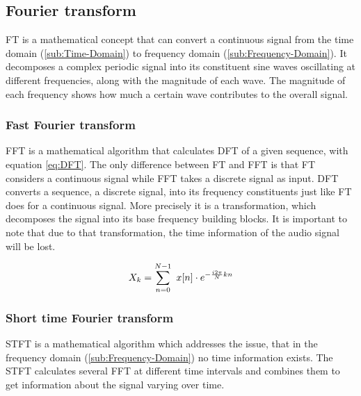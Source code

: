 \subsection{Fourier transform}
\label{sub:Fourier-Transform}
\Gls{FT} is a mathematical concept that can convert a continuous signal from the time domain (\ref{sub:Time-Domain}) to frequency domain (\ref{sub:Frequency-Domain}). It decomposes a complex periodic signal into its constituent sine waves oscillating at different frequencies, along with the magnitude of each wave. The magnitude of each frequency shows how much a certain wave contributes to the overall signal.

\subsubsection{Fast Fourier transform}
\label{subsub:Fast-Fourier-Transform}
\Gls{FFT} is a mathematical algorithm that calculates \gls{DFT} of a given sequence, with equation \ref{eq:DFT}. The only difference between \gls{FT} and \gls{FFT} is that \gls{FT} considers a continuous signal while \gls{FFT} takes a discrete signal as input. \Gls{DFT} converts a sequence, a discrete signal, into its frequency constituents just like \gls{FT} does for a continuous signal. More precisely it is a transformation, which decomposes the signal into its base frequency building blocks. It is important to note that due to that transformation, the time information of the audio signal will be lost.

\begin{equation}
    \centering
    X_k = \sum_{n=0}^{N-1} \ x[n] \cdot e^{-\frac{i2\pi}{N}kn}
    \label{eq:DFT}
\end{equation}

\subsubsection{Short time Fourier transform}
\label{subsub:Short-Time-Fourier-Transform}
\Gls{STFT} is a mathematical algorithm which addresses the issue, that in the frequency domain (\ref{sub:Frequency-Domain}) no time information exists. The \gls{STFT} calculates several \gls{FFT} at different time intervals and combines them to get information about the signal varying over time.

